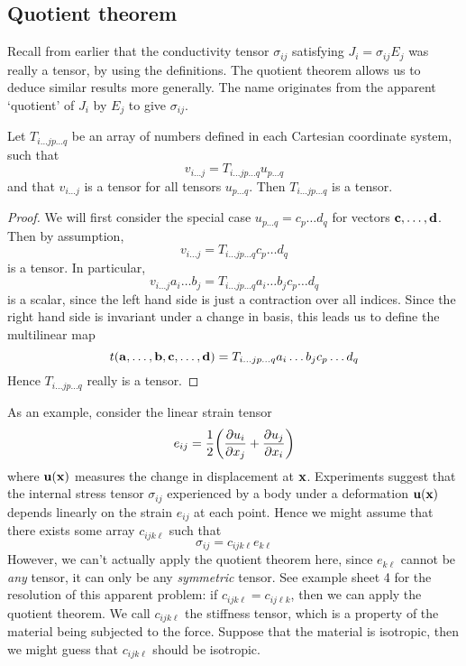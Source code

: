 \subsection{Quotient theorem}
Recall from earlier that the conductivity tensor \(\sigma_{ij}\) satisfying \(J_i = \sigma_{ij} E_j\) was really a tensor, by using the definitions.
The quotient theorem allows us to deduce similar results more generally.
The name originates from the apparent `quotient' of \(J_i\) by \(E_j\) to give \(\sigma_{ij}\).
\begin{proposition}
	Let \(T_{i\dots j p\dots q}\) be an array of numbers defined in each Cartesian coordinate system, such that
	\[
		v_{i\dots j} = T_{i\dots j p \dots q} u_{p\dots q}
	\]
	and that \(v_{i\dots j}\) is a tensor for all tensors \(u_{p\dots q}\).
	Then \(T_{i\dots j p\dots q}\) is a tensor.
\end{proposition}
\begin{proof}
	We will first consider the special case \(u_{p\dots q} = c_p \dots d_q\) for vectors \(\vb c, \dots, \vb d\).
	Then by assumption,
	\[
		v_{i\dots j} = T_{i\dots j p \dots q} c_p \dots d_q
	\]
	is a tensor.
	In particular,
	\[
		v_{i\dots j} a_i \dots b_j = T_{i\dots j p \dots q} a_i \dots b_j c_p \dots d_q
	\]
	is a scalar, since the left hand side is just a contraction over all indices.
	Since the right hand side is invariant under a change in basis, this leads us to define the multilinear map
	\[
		t(\vb a, \dots, \vb b, \vb c, \dots, \vb d) = T_{i\dots j p \dots q} a_i \dots b_j c_p \dots d_q
	\]
	Hence \(T_{i\dots j p \dots q}\) really is a tensor.
\end{proof}
As an example, consider the linear strain tensor
\[
	e_{ij} = \frac{1}{2}\qty( \pdv{u_i}{x_j} + \pdv{u_j}{x_i} )
\]
where \(\vb u(\vb x)\) measures the change in displacement at \(\vb x\).
Experiments suggest that the internal stress tensor \(\sigma_{ij}\) experienced by a body under a deformation \(\vb u(\vb x)\) depends linearly on the strain \(e_{ij}\) at each point.
Hence we might assume that there exists some array \(c_{ijk\ell}\) such that
\[
	\sigma_{ij} = c_{ijk\ell} e_{k\ell}
\]
However, we can't actually apply the quotient theorem here, since \(e_{k\ell}\) cannot be \textit{any} tensor, it can only be any \textit{symmetric} tensor.
See example sheet 4 for the resolution of this apparent problem: if \(c_{ijk\ell} = c_{ij\ell k}\), then we can apply the quotient theorem.
We call \(c_{ijk\ell}\) the stiffness tensor, which is a property of the material being subjected to the force.
Suppose that the material is isotropic, then we might guess that \(c_{ijk\ell}\) should be isotropic.
